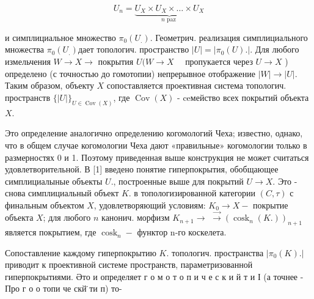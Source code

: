 \documentclass[10pt]{article}
\begin{document}
\[

U_{n}=\underbrace{U_{X} \times U_{X} \times \ldots \times U_{X}}_{n \text { paz }}

\]



и симплициальное множество $\pi_{0}\left(U_{.}\right)$. Геометрич. реализация симплициального множества $\pi_{0}\left(U_{.}\right)$дает топологич. пространство $|U|=\left|\pi_{0}(U).\right|$. Для любого измельчения $W \rightarrow X \rightarrow$ покрытия $U(W \rightarrow X \quad$ пропукается через $U \rightarrow X$ ) определено (с точностью до гомотопии) непрерывное отображение $|W| \rightarrow|U|$. Таким образом, объекту $X$ сопоставляется проективная система топологич. пространств $\{|U|\}_{U \in \operatorname{Cov}(X)}$, где $\operatorname{Cov}(X)$ - ceмейство всех покрытий объекта $X$.



Это определение аналогично определению когомологий Чеха; известно, однако, что в общем случае когомологии Чеха дают «правильные» когомологии только в размерностях 0 и 1. Поэтому приведенная выше конструкция не может считаться удовлетворительной. В [1] введено понятие гиперпокрытия, обобщающее симплициалыные объекты $U .$, построенные выше для покрытий $U \rightarrow X$. Это - снова симплициальный объект $K$. в топологизированной категории $(C, \tau)$ с финальным объектом $X$, удовлетворяющий условиям: $K_{0} \rightarrow X-$ покрытие объекта $X$; для любого $n$ канонич. морфизм $K_{n+1} \rightarrow$ $\vec{\longrightarrow}\left(\operatorname{cosk}_{n}(K .)\right)_{n+1}$ является покрытием, где $\operatorname{cosk}_{n}-$ функтор n-го коскелета.



Сопоставление каждому гиперпокрытию $K$. топологич. пространства $\left|\pi_{0}(K).\right|$ приводит к проективной системе пространств, параметризованной гиперпокрытиями. Әто и определяет г о м о т о п и ч е с к и й т и І (а точнее - Про г о о топи че скй̈ ти п) то-
\end{document}
